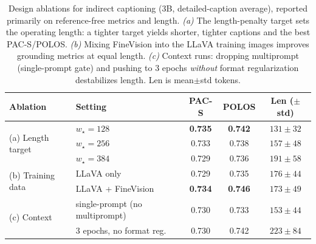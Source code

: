 \begin{table}[t]
\caption{Design ablations for indirect captioning (3B, detailed-caption average), reported primarily on
reference-free metrics and length. \emph{(a)} The length-penalty target sets the operating length: a tighter
target yields shorter, tighter captions and the best PAC-S/POLOS. \emph{(b)} Mixing FineVision into the LLaVA
training images improves grounding metrics at equal length. \emph{(c)} Context runs: dropping multiprompt
(single-prompt gate) and pushing to 3 epochs \emph{without} format regularization destabilizes length. Len is
mean$\pm$std tokens.}
\label{tab:cap_ablation2}
\begin{center}
\small
\begin{tabular}{llccc}
\toprule
Ablation & Setting & PAC-S & POLOS & Len ($\pm$std) \\
\midrule
\multirow{3}{*}{(a) Length target}
 & $w_\star=128$ & \textbf{0.735} & \textbf{0.742} & $131\pm32$ \\
 & $w_\star=256$ & 0.733 & 0.738 & $157\pm48$ \\
 & $w_\star=384$ & 0.729 & 0.736 & $191\pm58$ \\
\midrule
\multirow{2}{*}{(b) Training data}
 & LLaVA only         & 0.729 & 0.735 & $176\pm44$ \\
 & LLaVA + FineVision & \textbf{0.734} & \textbf{0.746} & $173\pm49$ \\
\midrule
\multirow{2}{*}{(c) Context}
 & single-prompt (no multiprompt) & 0.730 & 0.733 & $153\pm44$ \\
 & 3 epochs, no format reg.       & 0.730 & 0.742 & $223\pm84$ \\
\bottomrule
\end{tabular}
\end{center}
\end{table}
